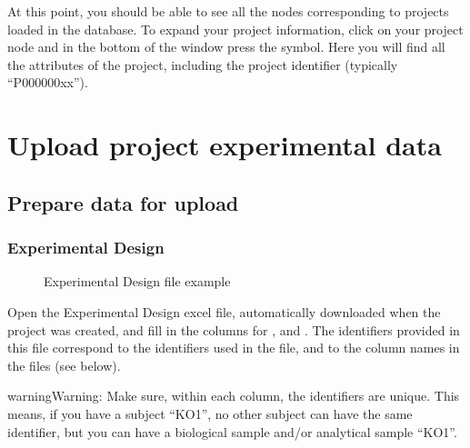 \documentclass[letterpaper,10pt,english]{sphinxmanual}
\begin{document}
At this point, you should be able to see all the nodes corresponding to projects loaded in the database.
To expand your project information, click on your project node and in the bottom of the window press the \sphinxcode{\sphinxupquote{\textless{}}} symbol. Here you will find all the attributes of the project, including the project identifier (typically “P000000xx”).


\section{Upload project experimental data}
\label{\detokenize{getting_started/upload-data:upload-project-experimental-data}}\label{\detokenize{getting_started/upload-data:upload-data}}\label{\detokenize{getting_started/upload-data::doc}}

\subsection{Prepare data for upload}
\label{\detokenize{getting_started/upload-data:prepare-data-for-upload}}

\subsubsection{Experimental Design}
\label{\detokenize{getting_started/upload-data:experimental-design}}\label{\detokenize{getting_started/upload-data:id1}}
\begin{figure}[htbp]
\centering
\capstart

\noindent{}
\caption{Experimental Design file example}\label{\detokenize{getting_started/upload-data:id3}}\end{figure}

Open the Experimental Design excel file, automatically downloaded when the project was created, and fill in the columns for ,  and .
The identifiers provided in this file  correspond to the identifiers used in the  file, and to the column names in the  files (see below).

\begin{sphinxadmonition}{warning}{Warning:}
Make sure, within each column, the identifiers are unique. This means, if you have a subject “KO1”, no other subject can have the same identifier, but you can have a biological sample and/or analytical sample “KO1”.
\end{sphinxadmonition}
\end{document}

